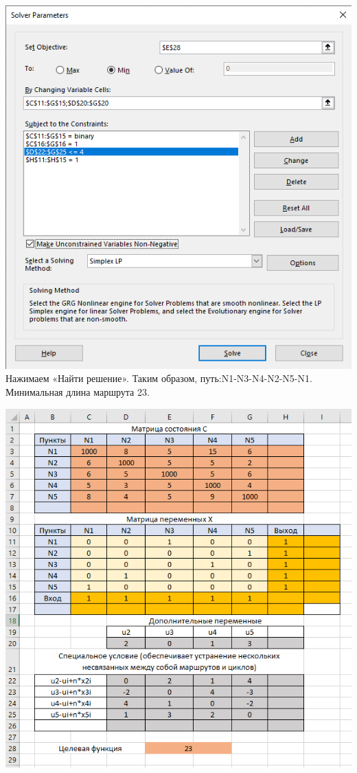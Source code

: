 \documentclass[a4paper, 12pt]{article}
\begin{document}
\includegraphics[width=\textwidth]{3-2.png}\\

\newpage
Нажимаем «Найти решение». Таким образом, путь:N1-N3-N4-N2-N5-N1. Минимальная длина маршрута 23.

\includegraphics[width=\textwidth]{3-3.png}\\
\end{document}
